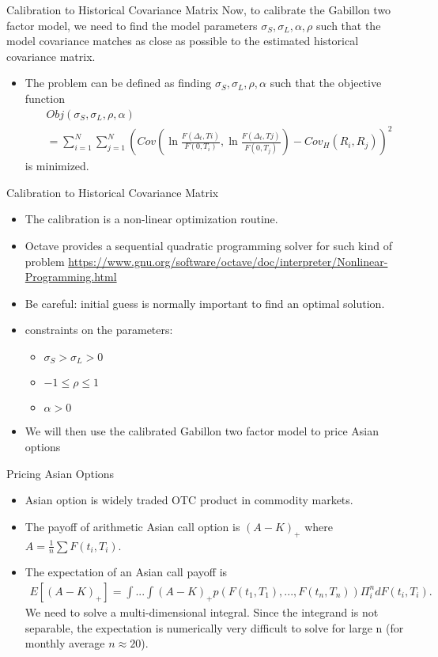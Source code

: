 \documentclass[11pt]{beamer}
\begin{document}
\begin{frame}{Calibration to Historical Covariance Matrix}
Now, to calibrate the Gabillon two factor model, we need to find the model parameters $\sigma_S, \sigma_L, \alpha, \rho$
such that the model covariance matches as close as possible to the estimated historical covariance matrix.

\begin{itemize}
\item The problem can be defined as finding $\sigma_S, \sigma_L, \rho, \alpha$ such that the objective function 
\begin{align*}
&Obj(\sigma_S, \sigma_L, \rho, \alpha) \\
&= \sum_{i=1}^{N} \sum_{j=1}^{N} \left(Cov\left(\ln\frac{F(\Delta_t, Ti)}{F(0, T_i)}, \ln\frac{F(\Delta_t, Tj)}{F(0, T_j)}\right) - Cov_H (R_i, R_j) \right)^2
\end{align*}
is minimized. 
\end{itemize}
\end{frame}

\begin{frame}{Calibration to Historical Covariance Matrix}
\begin{itemize}
\item The calibration is a non-linear optimization routine.
\item Octave provides a sequential quadratic programming solver for such kind of problem \url{https://www.gnu.org/software/octave/doc/interpreter/Nonlinear-Programming.html}
\item Be careful: initial guess is normally important to find an optimal solution.
\item constraints on the parameters:
\begin{itemize}
\item $\sigma_S > \sigma_L > 0$
\item $-1 \leq \rho \leq 1$
\item $\alpha > 0$
\end{itemize} 
\item We will then use the calibrated Gabillon two factor model to price Asian options
\end{itemize}
\end{frame}

\begin{frame}{Pricing Asian Options}
\begin{itemize}
\item Asian option is widely traded OTC product in commodity markets.
\item The payoff of arithmetic Asian call option is $(A - K)_+$ where $A = \frac{1}{n}\sum F(t_i, T_i)$.  
\item The expectation of an Asian call payoff is
\begin{align*}
E[(A - K)_+] = \int...\int(A-K)_+p(F(t_1, T_1),...,F(t_n, T_n))\Pi_i^n dF(t_i, T_i).
\end{align*}
We need to solve a multi-dimensional integral. Since the integrand is not separable, the expectation is numerically very difficult to solve for large n (for monthly average $n\approx 20$).
\end{itemize}
\end{frame}
\end{document}
